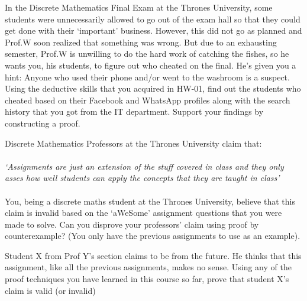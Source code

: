 \documentclass[addpoints]{exam}
\begin{document}
\begin{questions}
		\begin{solution}
			
		\end{solution}
		
		
		\question
		In the Discrete Mathematics Final Exam at the Thrones University, some students were unnecessarily allowed to go out of the exam hall so that they could get done with their `important' business. However, this did not go as planned and Prof.W soon realized that something was wrong. But due to an exhausting semester, Prof.W is unwilling to do the hard work of catching the fishes, so he wants you, his students, to figure out who cheated on the final. He's given you a hint: Anyone who used their phone and/or went to the washroom is a suspect. \\ 
		
		Using the deductive skills that you acquired in HW-01, find out the students who cheated based on their Facebook and WhatsApp profiles along with the search history that you got from the IT department. Support your findings by constructing a proof.
		\begin{solution}
			
		\end{solution}
		
		
		\question
		Discrete Mathematics Professors at the Thrones University claim that: \\ \\ 
		\textit{`Assignments are just an extension of the stuff covered in class and they only asses how well students can apply the concepts that they are taught in class'} \\ \\
		You, being a discrete maths student at the Thrones University, believe that this claim is invalid based on the `aWeSome' assignment questions that you were made to solve. Can you disprove your professors' claim using proof by counterexample? (You only have the previous assignments to use as an example). 
		\begin{solution}
			
		\end{solution}
		
		\question 
		Student X from Prof Y's section claims to be from the future. He thinks that this assignment, like all the previous assignments, makes no sense. Using any of the proof techniques you have learned in this course so far, prove that student X's claim is valid (or invalid)
		
		\begin{solution}
		\end{solution}
		
		
	\end{questions}
	
	
\end{document}
